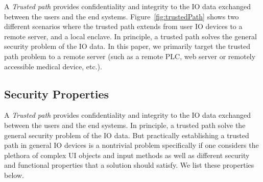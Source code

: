 A \emph{Trusted path} provides confidentiality and integrity to the IO data exchanged between the users and the end systems. Figure~\ref{fig:trustedPath} shows two different scenarios where the trusted path extends from user IO devices to \one a remote server, and \two a local enclave. In principle, a trusted path solves the general security problem of the IO data. 
In this paper, we primarily target the trusted path problem to a remote server (such as a remote PLC, web server or remotely accessible medical device, etc.).

\iffalse
\subsection{Security Properties}

A \emph{Trusted path} provides confidentiality and integrity to the IO data exchanged between the users and the end systems. In principle, a trusted path solve the general security problem of the IO data. But practically establishing a trusted path in general IO devices is a nontrivial problem specifically if one considers the plethora of complex UI objects and input methods as well as different security and functional properties that a solution should satisfy. We list these properties below. 


